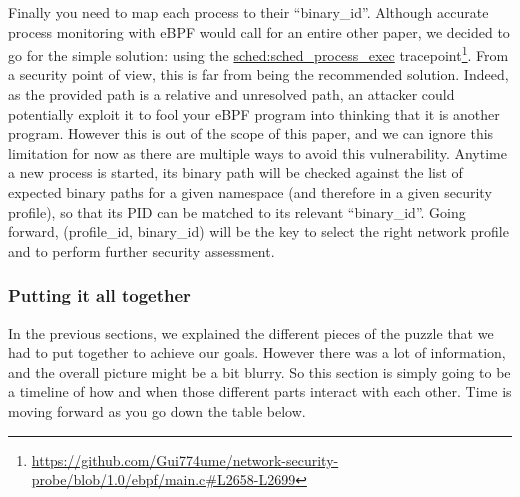 Finally you need to map each process to their “binary\_id”. Although accurate process monitoring with eBPF would call for an entire other paper, we decided to go for the simple solution: using the \url{sched:sched_process_exec} tracepoint\footnote{\url{https://github.com/Gui774ume/network-security-probe/blob/1.0/ebpf/main.c#L2658-L2699}}. From a security point of view, this is far from being the recommended solution. Indeed, as the provided path is a relative and unresolved path, an attacker could potentially exploit it to fool your eBPF program into thinking that it is another program. However this is out of the scope of this paper, and we can ignore this limitation for now as there are multiple ways to avoid this vulnerability. Anytime a new process is started, its binary path will be checked against the list of expected binary paths for a given namespace (and therefore in a given security profile), so that its PID can be matched to its relevant “binary\_id”. Going forward, (profile\_id, binary\_id) will be the key to select the right network profile and to perform further security assessment.

\subsubsection{Putting it all together}

In the previous sections, we explained the different pieces of the puzzle that we had to put together to achieve our goals. However there was a lot of information, and the overall picture might be a bit blurry. So this section is simply going to be a timeline of how and when those different parts interact with each other. Time is moving forward as you go down the table below.


